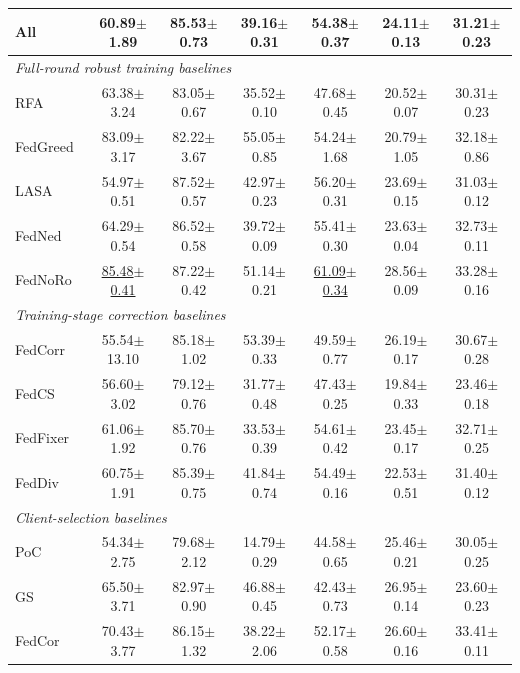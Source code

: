 ﻿\documentclass[conference]{IEEEtran}
\theoremstyle{definition}
\theoremstyle{remark}
\begin{document}
\begin{table}[!t]
\begin{tabular}{lcccccc}
		All & 60.89$\pm$1.89 & 85.53$\pm$0.73 & 39.16$\pm$0.31 & 54.38$\pm$0.37 & 24.11$\pm$0.13 & 31.21$\pm$0.23 \\
		\midrule
		\multicolumn{7}{l}{\textit{Full-round robust training baselines}} \\
		RFA~\cite{pillutla2022robust} & 63.38$\pm$3.24 & 83.05$\pm$0.67 & 35.52$\pm$0.10 & 47.68$\pm$0.45 & 20.52$\pm$0.07 & 30.31$\pm$0.23 \\
		FedGreed~\cite{kritharakis2025fedgreed} & 83.09$\pm$3.17 & 82.22$\pm$3.67 & 55.05$\pm$0.85 & 54.24$\pm$1.68 & 20.79$\pm$1.05 & 32.18$\pm$0.86 \\
		LASA~\cite{xu2025lasa} & 54.97$\pm$0.51 & 87.52$\pm$0.57 & 42.97$\pm$0.23 & 56.20$\pm$0.31 & 23.69$\pm$0.15 & 31.03$\pm$0.12 \\
		FedNed~\cite{lu2024fedned} & 64.29$\pm$0.54 & 86.52$\pm$0.58 & 39.72$\pm$0.09 & 55.41$\pm$0.30 & 23.63$\pm$0.04 & 32.73$\pm$0.11 \\
		FedNoRo~\cite{wu2023fednoro} & \underline{85.48$\pm$0.41} & 87.22$\pm$0.42 & 51.14$\pm$0.21 & \underline{61.09$\pm$0.34} & 28.56$\pm$0.09 & 33.28$\pm$0.16 \\
		\midrule
		\multicolumn{7}{l}{\textit{Training-stage correction baselines}} \\
		FedCorr~\cite{xu2022fedcorr} & 55.54$\pm$13.10 & 85.18$\pm$1.02 & 53.39$\pm$0.33 & 49.59$\pm$0.77 & 26.19$\pm$0.17 & 30.67$\pm$0.28 \\
		FedCS~\cite{hao2025fedcs} & 56.60$\pm$3.02 & 79.12$\pm$0.76 & 31.77$\pm$0.48 & 47.43$\pm$0.25 & 19.84$\pm$0.33 & 23.46$\pm$0.18 \\
		FedFixer~\cite{ji2024fedfixer} & 61.06$\pm$1.92 & 85.70$\pm$0.76 & 33.53$\pm$0.39 & 54.61$\pm$0.42 & 23.45$\pm$0.17 & 32.71$\pm$0.25 \\
		FedDiv~\cite{li2024feddiv} & 60.75$\pm$1.91 & 85.39$\pm$0.75 & 41.84$\pm$0.74 & 54.49$\pm$0.16 & 22.53$\pm$0.51 & 31.40$\pm$0.12 \\
		\midrule
		\multicolumn{7}{l}{\textit{Client-selection baselines}} \\
		PoC~\cite{cho2022power} & 54.34$\pm$2.75 & 79.68$\pm$2.12 & 14.79$\pm$0.29 & 44.58$\pm$0.65 & 25.46$\pm$0.21 & 30.05$\pm$0.25 \\
		GS~\cite{ma2021client} & 65.50$\pm$3.71 & 82.97$\pm$0.90 & 46.88$\pm$0.45 & 42.43$\pm$0.73 & 26.95$\pm$0.14 & 23.60$\pm$0.23 \\
		FedCor~\cite{tang2022fedcor} & 70.43$\pm$3.77 & 86.15$\pm$1.32 & 38.22$\pm$2.06 & 52.17$\pm$0.58 & 26.60$\pm$0.16 & 33.41$\pm$0.11 \\

\end{tabular}
\end{table}
\end{document}
